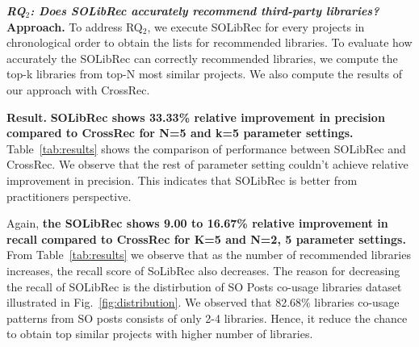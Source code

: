 \documentclass[paper]{ieice}
\newcommand{\RqTwo}{\textbf{RQ$_2$: Does SOLibRec accurately recommend third-party libraries?}}
\begin{document}
\noindent\textit{\RqTwo}\\

\noindent\textbf{Approach.} To address RQ$_2$, we execute SOLibRec for every projects in chronological order to obtain the lists for recommended libraries. To evaluate how accurately the SOLibRec can correctly recommended libraries, we compute the top-k libraries from top-N most similar projects. We also compute the results of our approach with CrossRec.\\


\begin{table}[]
\caption{Performance comparison of SOLibRec and CrossRec}
\label{tab:results}
\end{table}

\noindent\textbf{Result.} \textbf{SOLibRec shows 33.33\% relative improvement in precision compared to CrossRec for N=5 and k=5 parameter settings.} Table~\ref{tab:results} shows the comparison of performance between SOLibRec and CrossRec. We observe that the rest of parameter setting couldn't achieve relative improvement in precision. This indicates that SOLibRec is better from practitioners perspective.

Again, \textbf{the SOLibRec shows 9.00 to 16.67\% relative improvement in recall compared to CrossRec for K=5 and N=2, 5 parameter settings.} From Table~\ref{tab:results} we observe that as the number of recommended libraries increases, the recall score of SoLibRec also decreases. The reason for decreasing the recall of SOLibRec is the distirbution of SO Posts co-usage libraries dataset illustrated in Fig.~\ref{fig:distribution}. We observed that 82.68\% libraries co-usage patterns from SO posts consists of only 2-4 libraries. Hence, it reduce the chance to obtain top similar projects with higher number of libraries.
\end{document}
